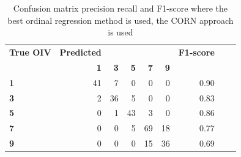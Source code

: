 \documentclass[english]{article}
\begin{document}
\begin{table}[H]
    \centering
    \caption{Confusion matrix precision recall and F1-score where the best ordinal regression method is used, the CORN approach is used}
    \label{tab:dtafracevol}
    \begin{tabular}{lrrrrrrrr}
        \toprule
        \textbf{True OIV} & \textbf{Predicted} &            &            &            &            & \textbf{F1-score}   \\
        {}                & \textbf{1}         & \textbf{3} & \textbf{5} & \textbf{7} & \textbf{9} &                   & \\
        \midrule
        \textbf{1}        & 41                 & 7          & 0          & 0          & 0          & 0.90                \\
        \textbf{3}        & 2                  & 36         & 5          & 0          & 0          & 0.83                \\
        \textbf{5}        & 0                  & 1          & 43         & 3          & 0          & 0.86                \\
        \textbf{7}        & 0                  & 0          & 5          & 69         & 18         & 0.77                \\
        \textbf{9}        & 0                  & 0          & 0          & 15         & 36         & 0.69                \\
        \bottomrule
    \end{tabular}
\end{table}


\end{document}
